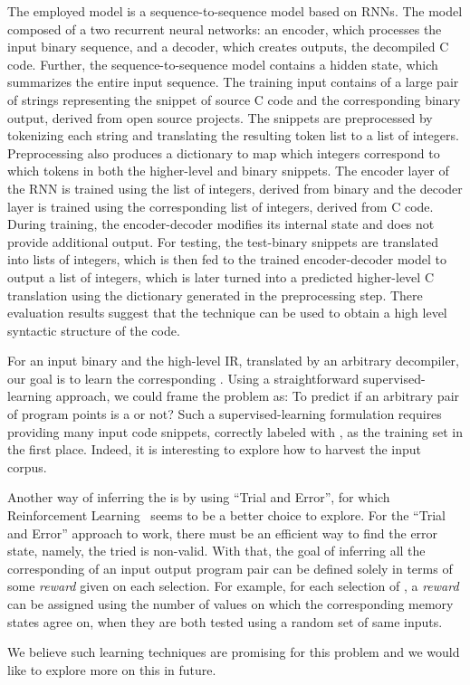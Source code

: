The employed model is  a sequence-to-sequence model based on RNNs. The model
composed of a two recurrent neural networks: an encoder, which processes the
input binary sequence, and a decoder, which creates outputs, the decompiled C
code. Further, the sequence-to-sequence model contains a hidden state, which
summarizes the entire input sequence. 
%
The training input contains of a large pair of strings representing the snippet
of source C code and the corresponding binary output, derived from open source
projects.  The snippets are preprocessed  by tokenizing each string  and
translating the resulting token list to a list of integers. Preprocessing also
produces a dictionary to map which integers correspond to which tokens in both
the higher-level and binary snippets.  The encoder layer of the RNN is trained
using the list of integers, derived from binary and the decoder layer is
trained using the corresponding list of integers, derived from C code.  During
training, the encoder-decoder modifies its internal state and does not provide
additional output. For testing, the test-binary snippets are translated into
lists of integers, which is then fed to the trained encoder-decoder model to
output a list of integers, which  is later turned into  a predicted higher-level C
translation using the dictionary  generated in the preprocessing step.
%
There evaluation results suggest that the technique  can be used to obtain a high level
syntactic structure of the code.
    
    
For an input binary and the high-level IR, translated by an arbitrary
decompiler, our goal is to learn the corresponding \syncp. Using a
straightforward  supervised-learning approach, we could frame the problem as:
To predict if an arbitrary pair of program points is a \syncp or not?
Such a supervised-learning formulation requires providing  many input code
snippets, correctly labeled with \syncps, as the training set in the first
place. Indeed, it is interesting to explore how to harvest the input corpus. 
 

Another way of inferring the \syncps is by using ``Trial and Error'', for which
Reinforcement Learning~\cite{Sutton:1998} seems to be a better choice to
explore. For the ``Trial and Error'' approach to work, there must be an
efficient way to find the error state, namely, the tried \syncp is non-valid.
With that, the goal of inferring all the corresponding \syncps of an input
output program pair can be defined solely in terms of some \emph{reward} given
on each selection. For example, for each selection of \syncp, a \emph{reward}
can be assigned using the number of values on which the corresponding memory
states agree on, when they are both tested using a random set of same  inputs.

We believe such learning techniques are promising for this problem and we would like to explore more on this in future.
